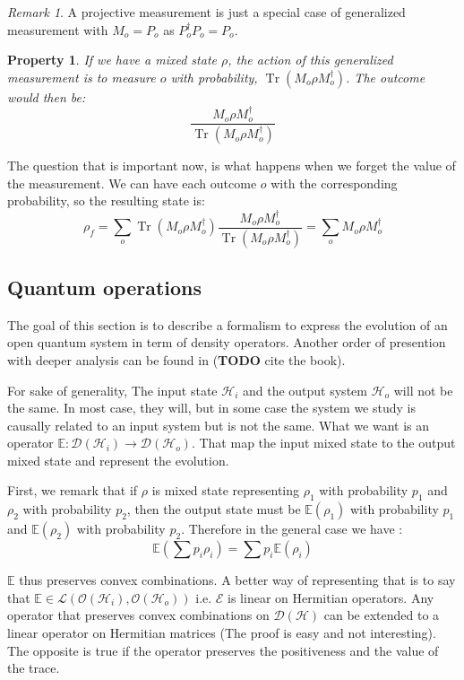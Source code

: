 \documentclass[10pt]{report}
\theoremstyle{plain}
\newtheorem{prop}[thm]{Property}
\theoremstyle{definition}
\theoremstyle{remark}
\newtheorem*{rem}{Remark}
\newcommand{\TODO}{\textbf{TODO}}
\DeclareMathOperator{\Tr}{Tr}
\newcommand{\trnorm}[1]{\frac{#1}{\Tr\left({#1}\right)}}
\begin{document}
\begin{rem}
  A projective measurement is just a special case of generalized measurement
  with $M_o=P_o$ as $P_o^\dagger P_o = P_o$.
\end{rem}

\begin{prop}
  If we have a mixed state $\rho$, the action of this generalized measurement is
  to measure $o$ with probability, $\Tr(M_o\rho M_o^\dagger)$. The outcome would
  then be:
  \[\trnorm{M_o\rho M_o^\dagger}\]
\end{prop}

The question that is important now, is what happens when we forget the value of
the measurement. We can have each outcome $o$ with the corresponding
probability, so the resulting state is:
\[\rho_f = \sum_o \Tr(M_o\rho M_o^\dagger)\trnorm{M_o\rho M_o^\dagger}
  =\sum_o M_o\rho M_o^\dagger \]



\subsection{Quantum operations}

The goal of this section is to describe a formalism to express the evolution of
an open quantum system in term of density operators. Another order of presention
with deeper analysis can be found in (\TODO{} cite the book).

For sake of generality, The input state
$\mathcal{H}_i$ and the output system $\mathcal{H}_o$ will not be the same. In
most case, they will, but in some case the system we study is causally related to
an input system but is not the same.
What we want is an operator $\mathbb{E} : \mathcal{D}(\mathcal{H}_i) \to
\mathcal{D}(\mathcal{H}_o)$. That map the input mixed state to the output mixed
state and represent the evolution.

First, we remark that if $\rho$ is mixed state representing $\rho_1$ with
probability $p_1$ and $\rho_2$ with probability $p_2$, then the output state
must be $\mathbb E(\rho_1)$ with probability $p_1$ and $\mathbb E(\rho_2)$ with
probability $p_2$. Therefore in the general case we have :
\[\mathbb E(\sum p_i \rho_i) = \sum p_i \mathbb E(\rho_i)\]

$\mathbb E$ thus preserves convex combinations. A better way of representing
that is to say that $\mathbb E \in
\mathcal{L}(\mathcal{O}(\mathcal{H}_i),\mathcal{O}(\mathcal{H}_o))$ i.e.
$\mathcal{E}$ is linear on Hermitian operators. Any operator that preserves
convex combinations on $\mathcal{D}(\mathcal{H})$ can be extended to a linear
operator on Hermitian matrices (The proof is easy and not interesting). The
opposite is true if the operator preserves the positiveness and the value of the
trace.
\end{document}
